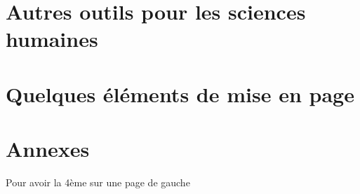 \part{Autres outils pour les sciences humaines}




\def\epi{La typographie est simple, aussi simple que de jouer du violon!}
\def\episource{Maximilien \textsc{Vox}, typographe}
\part{Quelques éléments de mise en page}





\def\epi{Avec un escalier prévu pour la montée, on réussit souvent à monter plus bas qu'on serait descendu avec un escalier prévu pour la descente.}
\def\episource{Dicton shadok}
\appendix
\part{Annexes}











\setcounter{tocdepth}{2}
\tableofcontents

\ifpapierstandard
Pour avoir la 4ème sur une page de gauche
\makeatletter
\ifodd\c@TotPages
\newpage\hbox{}\newpage
\else
\newpage\hbox{}
\fi
\makeatother

\fi